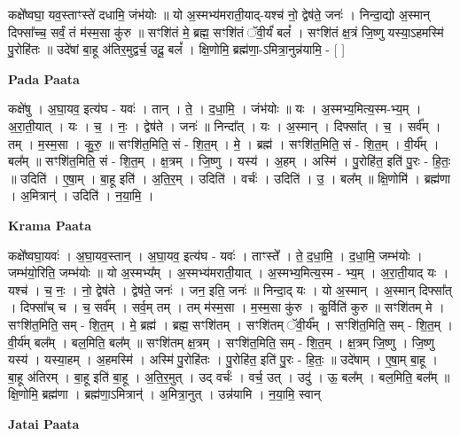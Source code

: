 \documentclass[17pt]{extarticle}
\begin{document}
कक्षे᳚ष्वघा॒ यव॒स्ताꣳस्ते॑ दधामि॒ जंभ॑योः ॥ यो अ॒स्मभ्य॑मराती॒याद्-यश्च॑ नो॒ द्वेष॑ते॒ जनः॑ । निन्दा॒द्यो अ॒स्मान् दिफ्सा᳚च्च॒ सर्वं॒ तं म॑स्म॒सा कु॑रु ॥ सꣳशि॑तं मे॒ ब्रह्म॒ सꣳशि॑तं ॅवी॒र्यं॑ बलं᳚ । सꣳशि॑तं क्ष॒त्रं जि॒ष्णु यस्या॒ऽहमस्मि॑ पु॒रोहि॑तः ॥ उदे॑षां बा॒हू अ॑तिर॒मुद्वर्च॒ उदू॒ बलं᳚ । क्षि॒णोमि॒ ब्रह्म॑णा॒-ऽमित्रा॒नुन्न॑यामि॒ - [  ] \newline

\textbf{Pada Paata} \newline

कक्षे॑षु । अ॒घा॒यव॒ इत्य॑घ - यवः॑ । तान् । ते॒ । द॒धा॒मि॒ । जंभ॑योः ॥ यः । अ॒स्मभ्य॒मित्य॒स्म-भ्य॒म् । अ॒रा॒ती॒यात् । यः । च॒ । नः॒ । द्वेष॑ते । जनः॑ ॥ निन्दा᳚त् । यः । अ॒स्मान् । दिफ्सा᳚त् । च॒ । सर्व᳚म् । तम् । म॒स्म॒सा । कु॒रु॒ ॥ सꣳशि॑त॒मिति॒ सं - शि॒त॒म् । मे॒ । ब्रह्म॑ । सꣳशि॑त॒मिति॒ सं - शि॒त॒म् । वी॒र्य᳚म् । बल᳚म् ॥ सꣳशि॑त॒मिति॒ सं - शि॒त॒म् । क्ष॒त्रम् । जि॒ष्णु । यस्य॑ । अ॒हम् । अस्मि॑ । पु॒रोहि॑त॒ इति॑ पु॒रः - हि॒तः॒ ॥ उदिति॑ । ए॒षा॒म् । बा॒हू इति॑ । अ॒ति॒र॒म् । उदिति॑ । वर्चः॑ । उदिति॑ । उ॒ । बल᳚म् ॥ क्षि॒णोमि॑ । ब्रह्म॑णा । अ॒मित्रान्॑ । उदिति॑ । न॒या॒मि॒ ।  \newline


\textbf{Krama Paata} \newline

कक्षे᳚ष्वघा॒यवः॑ । अ॒घा॒यव॒स्तान् । अ॒घा॒यव॒ इत्य॑घ - यवः॑ । ताꣳस्ते᳚ । ते॒ द॒धा॒मि॒ । द॒धा॒मि॒ जम्भ॑योः । जम्भ॑यो॒रिति॒ जम्भ॑योः ॥ यो अ॒स्मभ्य᳚म् । अ॒स्मभ्य॑मराती॒यात् । अ॒स्मभ्य॒मित्य॒स्म - भ्य॒म् । अ॒रा॒ती॒याद् यः । यश्च॑ । च॒ नः॒ । नो॒ द्वेष॑ते । द्वेष॑ते॒ जनः॑ । जन॒ इति॒ जनः॑ ॥ निन्दा॒द् यः । यो अ॒स्मान् । अ॒स्मान् दिफ्सा᳚त् । दिफ्सा᳚च् च । च॒ सर्व᳚म् । सर्व॒म् तम् । तम् म॑स्म॒सा । म॒स्म॒सा कु॑रु । कु॒र्विति॑ कुरु ॥ सꣳशि॑तम् मे । सꣳशि॑त॒मिति॒ सम् - शि॒त॒म् । मे॒ ब्रह्म॑ । ब्रह्म॒ सꣳशि॑तम् । सꣳशि॑तम् ॅवी॒र्य᳚म् । सꣳशि॑त॒मिति॒ सम् - शि॒त॒म् । वी॒र्य॑म् बल᳚म् । बल॒मिति॒ बल᳚म् ॥ सꣳशि॑तम् क्ष॒त्रम् । सꣳशि॑त॒मिति॒ सम् - शि॒त॒म् । क्ष॒त्रम् जि॒ष्णु । जि॒ष्णु यस्य॑ । यस्या॒हम् । अ॒हमस्मि॑ । अस्मि॑ पु॒रोहि॑तः । पु॒रोहि॑त॒ इति॑ पु॒रः - हि॒तः॒ ॥ उदे॑षाम् । ए॒षा॒म् बा॒हू । बा॒हू अ॑तिरम् । बा॒हू इति॑ बा॒हू । अ॒ति॒र॒मुत् । उद् वर्चः॑ । वर्च॒ उत् । उदु॑ । ऊ॒ बल᳚म् । बल॒मिति॒ बल᳚म् ॥ क्षि॒णोमि॒ ब्रह्म॑णा । ब्रह्म॑णा॒ऽमित्रान्॑ । अ॒मित्रा॒नुत् । उन्न॑यामि । न॒या॒मि॒ स्वान् \newline

\textbf{Jatai Paata} \newline
\end{document}
